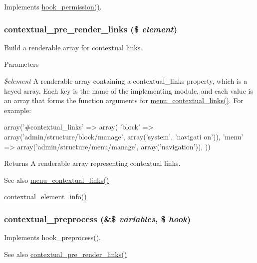 \label{contextual_8module_a5a266483e5b6edffd2fe826a7f1a43bd}
Implements \hyperlink{group__hooks_ga2b22b45f4925f2478412477bae329713}{hook\_\-permission()}. \hypertarget{contextual_8module_a8092553aa170452c7082015e1b930d6b}{
\subsubsection[{contextual\_\-pre\_\-render\_\-links}]{\setlength{\rightskip}{0pt plus 5cm}contextual\_\-pre\_\-render\_\-links (\$ {\em element})}}
\label{contextual_8module_a8092553aa170452c7082015e1b930d6b}
Build a renderable array for contextual links.


\begin{DoxyParams}{Parameters}
\item[{\em \$element}]A renderable array containing a contextual\_\-links property, which is a keyed array. Each key is the name of the implementing module, and each value is an array that forms the function arguments for \hyperlink{group__menu_gad524d9a3415e24d27c7dbcb333d96cf8}{menu\_\-contextual\_\-links()}. For example: 
\begin{DoxyCode}
     array('#contextual_links' => array(
       'block' => array('admin/structure/block/manage', array('system', 'navigati
      on')),
       'menu' => array('admin/structure/menu/manage', array('navigation')),
     ))
\end{DoxyCode}
\end{DoxyParams}
\begin{DoxyReturn}{Returns}
A renderable array representing contextual links.
\end{DoxyReturn}
\begin{DoxySeeAlso}{See also}
\hyperlink{group__menu_gad524d9a3415e24d27c7dbcb333d96cf8}{menu\_\-contextual\_\-links()} 

\hyperlink{contextual_8module_a2a9686f026c3602b46ba08f4b651edd6}{contextual\_\-element\_\-info()} 
\end{DoxySeeAlso}
\hypertarget{contextual_8module_a2c7f7612d49ab547e1b47afed806a21e}{
\subsubsection[{contextual\_\-preprocess}]{\setlength{\rightskip}{0pt plus 5cm}contextual\_\-preprocess (\&\$ {\em variables}, \/  \$ {\em hook})}}
\label{contextual_8module_a2c7f7612d49ab547e1b47afed806a21e}
Implements hook\_\-preprocess().

\begin{DoxySeeAlso}{See also}
\hyperlink{contextual_8module_a8092553aa170452c7082015e1b930d6b}{contextual\_\-pre\_\-render\_\-links()} 
\end{DoxySeeAlso}
